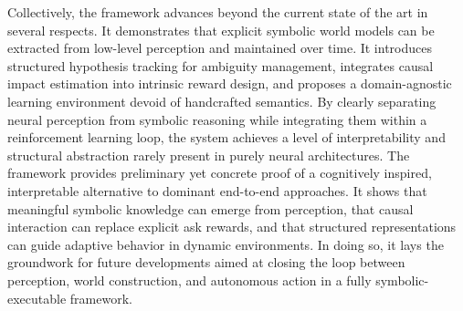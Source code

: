 \documentclass[12pt,a4paper]{report}
\begin{document}
Collectively, the framework advances beyond the current state of the art in several respects. It 
demonstrates that explicit symbolic world models can be extracted from low-level perception and maintained over time. It introduces structured hypothesis tracking for ambiguity management, integrates causal impact estimation into intrinsic reward design, and proposes a domain-agnostic learning environment devoid of handcrafted semantics. By clearly separating neural perception from symbolic reasoning while integrating them within a reinforcement learning loop, the system achieves a level of interpretability and structural abstraction rarely present in purely neural architectures.
The framework provides preliminary yet concrete proof of a cognitively inspired, interpretable alternative to dominant end-to-end approaches. It shows that meaningful symbolic knowledge can emerge from perception, that causal interaction can replace explicit ask rewards, and that structured representations can guide adaptive behavior in dynamic environments. 
In doing so, it lays the groundwork for future developments aimed at closing the loop between perception, world construction, and autonomous action in a fully symbolic-executable framework.
\end{document}
